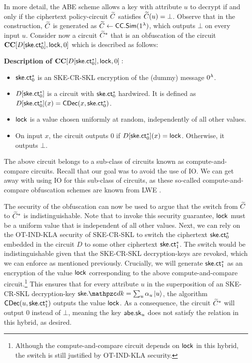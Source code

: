 In more detail, the ABE scheme allows a key with attribute $u$ to
decrypt if and only if the ciphertext policy-circuit $\widetilde{C}$ satisfies
$\widetilde{C}(u) = \bot$. Observe that in the construction, $\widetilde{C}$ is
generated as $\widetilde{C} \leftarrow
\mathsf{CC}.\mathsf{Sim}(1^\lambda)$, which outputs $\bot$ on every input $u$. Consider
now a circuit $\widetilde{C}^*$ that is an obfuscation of the circuit
$\mathbf{CC}[D[\mathsf{ske}.\mathsf{ct}^*_0],\mathsf{lock}, 0]$ which is described as follows:

\begin{description}
\item {\bf Description of $\mathbf{CC}[D[\mathsf{ske}.\mathsf{ct}^*_0],\mathsf{lock}, 0]:$}
\begin{itemize}
\item $\mathsf{ske}.\mathsf{ct}_0^*$ is an SKE-CR-SKL encryption of the (dummy) message $0^\lambda$.
\item $D[\mathsf{ske}.\mathsf{ct}_0^*]$ is a circuit with $\mathsf{ske}.\mathsf{ct}^*_0$ hardwired. It
is defined as $D[\mathsf{ske}.\mathsf{ct}_0^*](x) = \mathsf{CDec}(x, \mathsf{ske}.\mathsf{ct}_0^*)$.
\item $\mathsf{lock}$ is a value chosen uniformly at random, independently of all
other values.
\item On input $x$, the circuit outputs $0$ if $D[\mathsf{ske}.\mathsf{ct}_0^*](x) = \mathsf{lock}$. Otherwise, it outputs $\bot$.
\end{itemize}
\end{description}

The above circuit belongs to a sub-class of circuits known as
compute-and-compare circuits. Recall that our goal was to avoid the use
of IO. We can get away with using IO for this sub-class of
circuits, as these so-called compute-and-compare obfuscation schemes are known
from LWE \cite{FOCS:GoyKopWat17,FOCS:WicZir17}.

The security of the obfuscation can now be used to argue that the
switch from $\widetilde{C}$ to $\widetilde{C}^*$ is indistinguishable. Note that to
invoke this security guarantee, $\mathsf{lock}$ must be a
uniform value that is independent of all other values. Next, we
can rely on the OT-IND-KLA security of SKE-CR-SKL to switch the ciphertext
$\mathsf{ske}.\mathsf{ct}_0^*$ embedded in the circuit $D$ to some other ciphertext
$\mathsf{ske}.\mathsf{ct}_1^*$. The switch would be indistinguishable given that the
SKE-CR-SKL decryption-keys are revoked, which we can enforce as
mentioned previously. Crucially, we will generate $\mathsf{ske}.\mathsf{ct}_1^*$ as an
encryption of the value $\mathsf{lock}$ corresponding to the above
compute-and-compare circuit.\footnote{Although the compute-and-compare
circuit depends on $\mathsf{lock}$ in this hybrid, the switch is still
justified by OT-IND-KLA security.} This ensures that for every attribute $u$
in the superposition of an SKE-CR-SKL decryption-key $\ske.\qdk =
\sum_u \alpha_u \ket{u}$, the algorithm $\mathsf{CDec}(u, \mathsf{ske}.\mathsf{ct}_1^*)$
outputs the value $\mathsf{lock}$. As a consequence, the circuit $\widetilde{C}^*$
will output $0$ instead of $\bot$, meaning the key $\mathsf{abe}.\mathsf{sk}_u$ does
not satisfy the relation in this hybrid, as desired.

